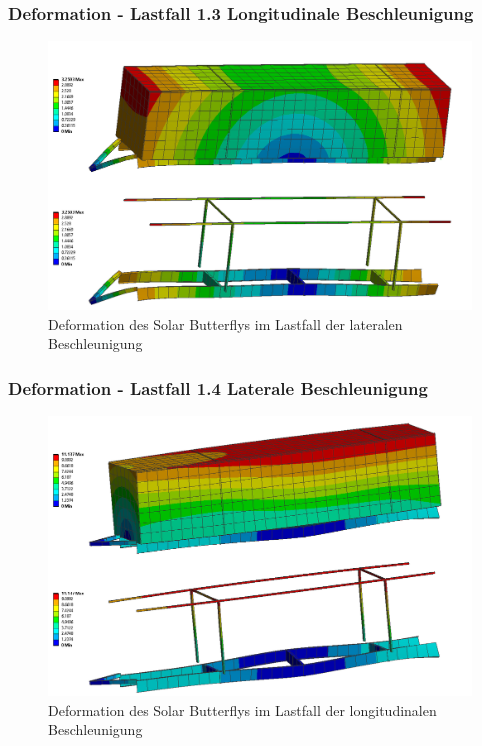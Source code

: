 \subsubsection{Deformation - Lastfall 1.3 Longitudinale Beschleunigung}
\begin{figure}[H]
  \centering
  \includegraphics[width=1\linewidth]{04_figures/FEM 1.2.png}
  \caption{Deformation des Solar Butterflys im Lastfall der lateralen Beschleunigung}
  \label{FEM 1.3}
\end{figure}

\subsubsection{Deformation - Lastfall 1.4 Laterale Beschleunigung}
\begin{figure}[H]
  \centering
  \includegraphics[width=1\linewidth]{04_figures/FEM 1.4.png}
  \caption{Deformation des Solar Butterflys im Lastfall der longitudinalen Beschleunigung}
  \label{FEM 1.4}
\end{figure}

